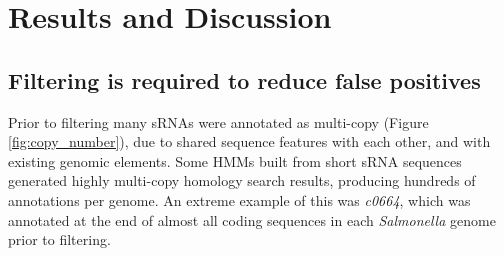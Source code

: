 \section{Results and Discussion}
\subsection{Filtering is required to reduce false positives}

Prior to filtering many sRNAs were annotated as multi-copy (Figure \ref{fig:copy_number}), due to shared sequence features with each other, and with existing genomic elements. Some HMMs built from short sRNA sequences generated highly multi-copy homology search results, producing hundreds of annotations per genome. An extreme example of this was \textit{c0664}, which was annotated at the end of almost all coding sequences in each \textit{Salmonella} genome prior to filtering. 

